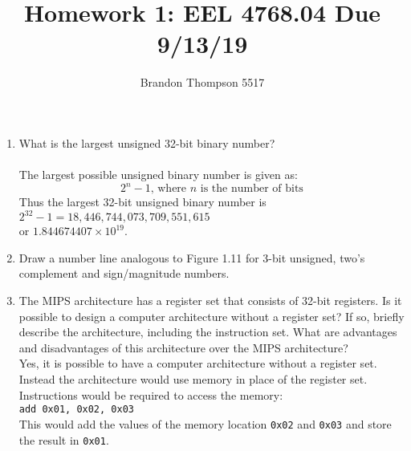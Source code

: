 \documentclass[a4paper]{article}
\begin{document}
	\author{Brandon Thompson 5517}
	\title{Homework 1: EEL 4768.04 Due 9/13/19}
	\maketitle

	\medskip

	\begin{enumerate}
		\item
		What is the largest unsigned 32-bit binary number?\\\\
		The largest possible unsigned binary number is given as:
		\begin{equation}
			2^n-1 \textrm{,\ where $n$ is the number of bits}
		\end{equation}
		Thus the largest 32-bit unsigned binary number is $2^{32}-1 = 18,446,744,073,709,551,615$
		\\ or $1.844674407 \times 10^{19}$.
		\item
		Draw a number line analogous to Figure 1.11 for 3-bit unsigned, two's complement
		and sign/magnitude numbers.\\
		\begin{figure}[h]
			\centering
		\end{figure}	
		\item
		The MIPS architecture has a register set that consists of 32-bit registers. 
		Is it possible to design a computer architecture without a register set? 
		If so, briefly describe the architecture, including the instruction set. 
		What are advantages and disadvantages of this architecture over the MIPS architecture?\\


		Yes, it is possible to have a computer architecture without a register set. Instead
		the architecture would use memory in place of the register set. Instructions would
		be required to access the memory:\\
		\texttt{add 0x01, 0x02, 0x03}\\
		This would add the values of the memory location \texttt{0x02} and \texttt{0x03} and
		store the result in \texttt{0x01}.\\


\end{enumerate}
\end{document}
